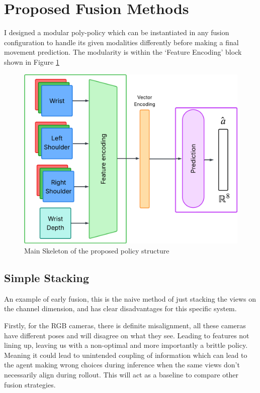 
\section{Proposed Fusion Methods}\label{sec:proposed-fusion}
I designed a modular poly-policy which can be instantiated in any fusion configuration to handle its given modalities differently before making a final movement prediction. The modularity is within the `Feature Encoding' block shown in Figure \ref{fig:policies-skeleton-idea}

\begin{figure}[htpb]
  \centering
  \includegraphics[scale=0.1]{assets/cam-comb/policies/general-diagram.png}
  \caption{Main Skeleton of the proposed policy structure}\label{fig:policies-skeleton-idea}
\end{figure}

\subsection{Simple Stacking}
An example of early fusion, this is the naive method of just stacking the views on the channel dimension, and has clear disadvantages for this specific system.

Firstly, for the RGB cameras, there is definite misalignment, all these cameras have different poses and will disagree on what they see. Leading to features not lining up, leaving us with a non-optimal and more importantly a brittle policy. Meaning it could lead to unintended coupling of information which can lead to the agent making wrong choices during inference when the same views don't necessarily align during rollout. This will act as a baseline to compare other fusion strategies.

